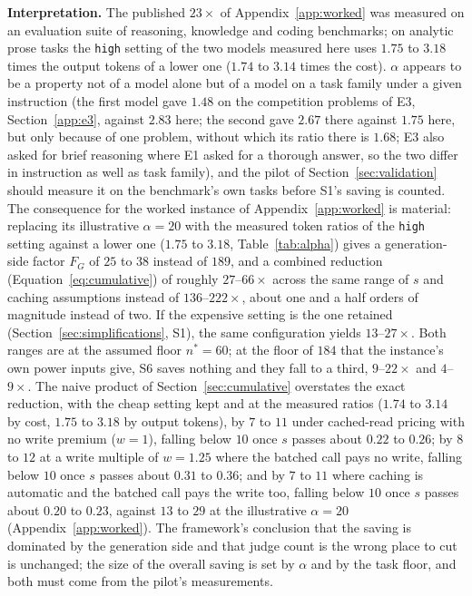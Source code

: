 \documentclass[11pt]{article}
\begin{document}
\textbf{Interpretation.} The published $23\times$ of Appendix~\ref{app:worked} was
measured on an evaluation suite of reasoning, knowledge and coding benchmarks; on analytic prose tasks the \texttt{high} setting of the two
models measured here uses $1.75$ to $3.18$ times the output tokens of a lower one ($1.74$ to $3.14$ times the cost). $\alpha$ appears to be a
property not of a model alone but of a model on a task family under a given instruction (the first model gave $1.48$ on the competition problems of E3, Section~\ref{app:e3}, against $2.83$ here; the second gave $2.67$ there against $1.75$ here, but only because of one problem, without which its ratio there is $1.68$; E3 also asked for brief reasoning where E1 asked for a thorough answer, so the two differ in instruction as well as task family), and the pilot of
Section~\ref{sec:validation} should measure it on the benchmark's own tasks before S1's
saving is counted. The consequence for the worked instance of Appendix~\ref{app:worked}
is material: replacing its illustrative $\alpha = 20$ with the measured token ratios of the \texttt{high} setting against a lower one ($1.75$ to $3.18$, Table~\ref{tab:alpha}) gives a
generation-side factor $F_G$ of $25$ to $38$ instead of $189$, and a combined reduction
(Equation~\ref{eq:cumulative}) of roughly $27$--$66\times$ across the same range of $s$
and caching assumptions instead of $136$--$222\times$, about one and a half orders of magnitude instead of two. If the expensive setting is the one retained
(Section~\ref{sec:simplifications}, S1), the same configuration yields $13$--$27\times$. Both ranges are at the assumed floor $n^* = 60$; at the floor of $184$ that the instance's own power inputs give, S6 saves nothing and they fall to a third, $9$--$22\times$ and $4$--$9\times$. The naive product of Section~\ref{sec:cumulative} overstates the exact reduction, with the cheap setting kept and at the measured ratios ($1.74$ to $3.14$ by cost, $1.75$ to $3.18$ by output tokens), by $7$ to $11$ under cached-read pricing with no write premium ($w = 1$), falling below $10$ once $s$ passes about $0.22$ to $0.26$; by $8$ to $12$ at a write multiple of $w = 1.25$ where the batched call pays no write, falling below $10$ once $s$ passes about $0.31$ to $0.36$; and by $7$ to $11$ where caching is automatic and the batched call pays the write too, falling below $10$ once $s$ passes about $0.20$ to $0.23$, against $13$ to $29$ at the illustrative $\alpha = 20$ (Appendix~\ref{app:worked}).
The framework's conclusion that the saving is dominated by the generation side and that
judge count is the wrong place to cut is unchanged; the size of the overall saving is set by $\alpha$ and by the task floor, and both must come from the pilot's measurements.
\end{document}
